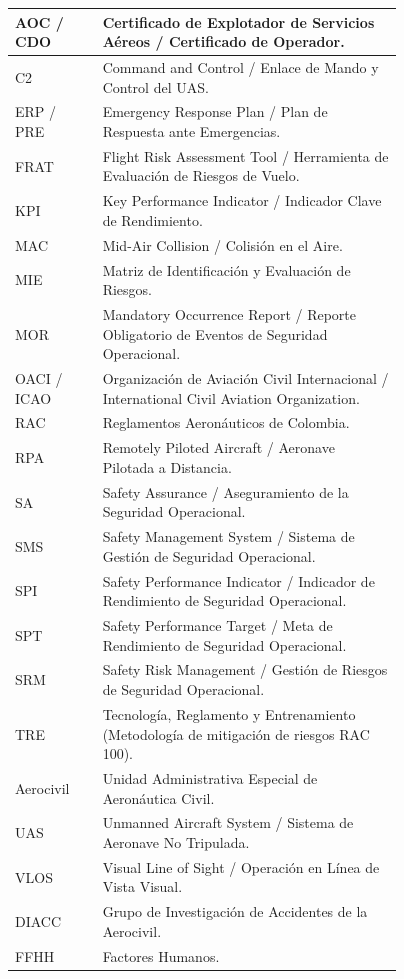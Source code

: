 \begin{longtable}{|>{\centering\arraybackslash}m{0.17\linewidth}|m{0.6\linewidth}|}
AOC / CDO & Certificado de Explotador de Servicios Aéreos / Certificado de Operador. \\ \hline
C2 & Command and Control / Enlace de Mando y Control del UAS. \\ \hline
ERP / PRE & Emergency Response Plan / Plan de Respuesta ante Emergencias. \\ \hline
FRAT & Flight Risk Assessment Tool / Herramienta de Evaluación de Riesgos de Vuelo. \\ \hline
KPI & Key Performance Indicator / Indicador Clave de Rendimiento. \\ \hline
MAC & Mid-Air Collision / Colisión en el Aire. \\ \hline
MIE & Matriz de Identificación y Evaluación de Riesgos. \\ \hline
MOR & Mandatory Occurrence Report / Reporte Obligatorio de Eventos de Seguridad Operacional. \\ \hline
OACI / ICAO & Organización de Aviación Civil Internacional / International Civil Aviation Organization. \\ \hline
RAC & Reglamentos Aeronáuticos de Colombia. \\ \hline
RPA & Remotely Piloted Aircraft / Aeronave Pilotada a Distancia. \\ \hline
SA & Safety Assurance / Aseguramiento de la Seguridad Operacional. \\ \hline
SMS & Safety Management System / Sistema de Gestión de Seguridad Operacional. \\ \hline
SPI & Safety Performance Indicator / Indicador de Rendimiento de Seguridad Operacional. \\ \hline
SPT & Safety Performance Target / Meta de Rendimiento de Seguridad Operacional. \\ \hline
SRM & Safety Risk Management / Gestión de Riesgos de Seguridad Operacional. \\ \hline
TRE & Tecnología, Reglamento y Entrenamiento (Metodología de mitigación de riesgos RAC 100). \\ \hline
Aerocivil & Unidad Administrativa Especial de Aeronáutica Civil. \\ \hline
UAS & Unmanned Aircraft System / Sistema de Aeronave No Tripulada. \\ \hline
VLOS & Visual Line of Sight / Operación en Línea de Vista Visual. \\ \hline
DIACC & Grupo de Investigación de Accidentes de la Aerocivil. \\ \hline
FFHH & Factores Humanos. \\ \hline

\end{longtable}
